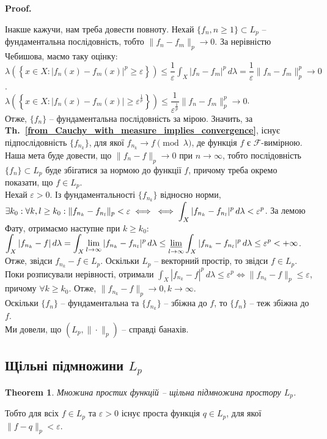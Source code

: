 \documentclass[a4paper, 10pt]{article}
\makeatletter
\theoremstyle{theoremdd}
\newtheorem{theorem}{Theorem}[subsection]
\newcommand\thref[1]{\textbf{Th.~\ref{#1}}}
\renewenvironment{proof}[1][Proof.\\]{\par
\pushQED{\hfill \qed}%
\normalfont \topsep6\p@\@plus6\p@\relax
\trivlist
\item\relax
{\bfseries
#1\@addpunct{.}}\hspace\labelsep\ignorespaces
}{%
\popQED\endtrivlist\@endpefalse
}
\makeatother
\begin{document}
\begin{proof}
Інакше кажучи, нам треба довести повноту. Нехай $\{f_n, n \geq 1\} \subset L_p$ -- фундаментальна послідовність, тобто $\|f_n - f_m\|_p \to 0$. За нерівністю Чебишова, маємо таку оцінку:\\
$\displaystyle\lambda\left(\left\{ x \in X: |f_n(x) - f_m(x)|^p \geq \varepsilon \right\}\right) \leq \dfrac{1}{\varepsilon} \int_X |f_n - f_m|^p\,d\lambda = \dfrac{1}{\varepsilon} \|f_n - f_m\|_p^p \to 0$.\\
$\displaystyle\lambda\left(\left\{ x \in X: |f_n(x) - f_m(x)| \geq \varepsilon^{\frac{1}{p}} \right\}\right) \leq \dfrac{1}{\varepsilon^{\frac{1}{p}}} \|f_n - f_m\|^p_p \to 0$.\\
Отже, $\{f_n\}$ -- фундаментальна послідовність за мірою. Значить, за \thref{from_Cauchy_with_measure_implies_convergence}, існує підпослідовність $\{f_{n_k}\}$, для якої $f_{n_k} \to f \pmod \lambda$, де функція $f$ є $\mathcal{F}$-вимірною. Наша мета буде довести, що $\|f_n - f\|_p \to 0$ при $n \to \infty$, тобто послідовність $\{f_n\} \subset L_p$ буде збігатися за нормою до функції $f$, причому треба окремо показати, що $f \in L_p$.\\
Нехай $\varepsilon > 0$. Із фундаментальності $\{f_{n_k}\}$ відносно норми, $\exists k_0: \forall k,l \geq k_0: \| f_{n_k} - f_{n_l}\|_p < \varepsilon \iff \\
\iff \displaystyle\int_X |f_{n_k} - f_{n_l}|^p\,d\lambda < \varepsilon^p$. За лемою Фату, отримаємо наступне при $k \geq k_0$:\\
$\displaystyle\int_X |f_{n_k} -f|\,d\lambda = \int_X \lim_{l \to \infty} |f_{n_k} - f_{n_l}|^p\,d\lambda \leq \varliminf_{l \to \infty} \int_X |f_{n_k} - f_{n_l}|^p\,d\lambda \leq \varepsilon^p < +\infty$.\\
Отже, звідси $f_{n_k} - f \in L_p$. Оскільки $L_p$ -- векторний простір, то звідси $f \in L_p$.\\
Поки розписували нерівності, отримали $\displaystyle\int_X |f_{n_k} - f|^p\,d\lambda \leq \varepsilon^p \iff \|f_{n_k} - f\|_p \leq \varepsilon$, причому $\forall k \geq k_0$. Отже, $\|f_{n_k} - f\|_p \to 0, k \to \infty$.\\
Оскільки $\{f_n\}$ -- фундаментальна та $\{f_{n_k}\}$ -- збіжна до $f$, то $\{f_n\}$ -- теж збіжна до $f$.\\
Ми довели, що $(L_p, \| \cdot \|_p)$ -- справді банахів.
\end{proof}

\subsection{Щільні підмножини $L_p$}
\begin{theorem}
Множина простих функцій -- щільна підмножина простору $L_p$.
\end{theorem}
\noindent
Тобто для всіх $f \in L_p$ та $\varepsilon > 0$ існує проста функція $q \in L_p$, для якої $\|f-q\|_p < \varepsilon$.
\end{document}
